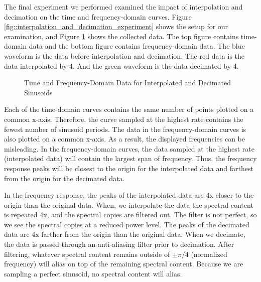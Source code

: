 \documentclass{article}
\begin{document}
The final experiment we performed examined the impact of interpolation and decimation on the time and frequency-domain curves. Figure \ref{fig::interpolation_and_decimation_experiment} shows the setup for our examination, and Figure \ref{fig::interpolation_and_decimation_waveforms} shows the collected data. The top figure contains time-domain data and the bottom figure contains frequency-domain data. The blue waveform is the data before interpolation and decimation. The red data is the data interpolated by 4. And the green waveform is the data decimated by 4.

\begin{figure}[H]
	\centerline{}
	\caption{Time and Frequency-Domain Data for Interpolated and Decimated Sinusoids}
	\label{fig::interpolation_and_decimation_waveforms}
\end{figure}

Each of the time-domain curves contains the same number of points plotted on a common x-axis. Therefore, the curve sampled at the highest rate contains the fewest number of sinusoid periods. The data in the frequency-domain curves is also plotted on a common x-axis. As a result, the displayed frequencies can be misleading. In the frequency-domain curves, the data sampled at the highest rate (interpolated data) will contain the largest span of frequency. Thus, the frequency response peaks will be closest to the origin for the interpolated data and farthest from the origin for the decimated data. 

In the frequency response, the peaks of the interpolated data are 4x closer to the origin than the original data. When, we interpolate the data the spectral content is repeated 4x, and the spectral copies are filtered out. The filter is not perfect, so we see the spectral copies at a reduced power level. The peaks of the decimated data are 4x farther from the origin than the original data. When we decimate, the data is passed through an anti-aliasing filter prior to decimation. After filtering, whatever spectral content remains outside of $\pm\pi/4$ (normalized frequency) will alias on top of the remaining spectral content. Because we are sampling a perfect sinusoid, no spectral content will alias.
\end{document}
